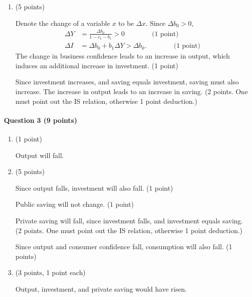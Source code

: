 \documentclass[12pt]{article}
\begin{document}
\begin{enumerate}[label=\alph*.]
	\item (5 points)
	
	Denote the change of a variable $x$ to be $\Delta x$. Since $\Delta b_0 >0$, 
	\begin{align*}
		\Delta Y &= \frac{\Delta b_0}{1-c_1-b_1} > 0 \qquad\qquad \text{(1 point)}\\
		\Delta I &= \Delta b_0 + b_1 \Delta Y > \Delta b_0. \qquad\qquad \text{(1 point)}
	\end{align*}
	The change in business confidence leads to an increase in output, which induces an additional increase in investment. (1 point)
	
	Since investment increases, and saving equals investment, saving must also increase. The increase in output leads to an increase in saving. (2 points. One must point out the IS relation, otherwise 1 point deduction.)
\end{enumerate}

\paragraph{Question 3 (9 points)}
\begin{enumerate}[label=\alph*.]
	\item (1 point)
	
	Output will fall.
	\item (5 points)
	
	Since output falls, investment will also fall. (1 point) 
	
	Public saving will not change. (1 point) 
	
	Private saving will fall, since investment falls, and investment equals saving. (2 points. One must point out the IS relation, otherwise 1 point deduction.)
	
	Since output and consumer confidence fall, consumption will also fall. (1 points)
	\item (3 points, 1 point each)
	
	Output, investment, and private saving would have risen.
\end{enumerate}
\end{document}
